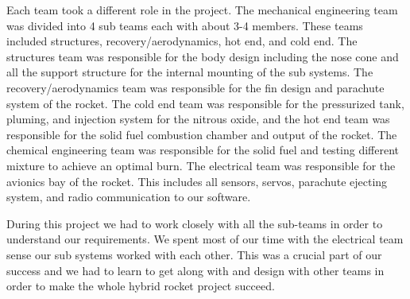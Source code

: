 \documentclass[10pt,draftclsnofoot,onecolumn,retainorgcmds]{IEEEtran}
\begin{document}
Each team took a different role in the project. The mechanical engineering team was divided into 4 sub teams each with about 3-4 members. These teams included structures, recovery/aerodynamics, hot end, and cold end. The structures team was responsible for the body design including the nose cone and all the support structure for the internal mounting of the sub systems. The recovery/aerodynamics team was responsible for the fin design and parachute system of the rocket. The cold end team was responsible for the pressurized tank, pluming, and injection system for the nitrous oxide, and the hot end team was responsible for the solid fuel combustion chamber and output of the rocket. The chemical engineering team was responsible for the solid fuel and testing different mixture to achieve an optimal burn. The electrical team was responsible for the avionics bay of the rocket. This includes all sensors, servos, parachute ejecting system, and radio communication to our software. \par
During this project we had to work closely with all the sub-teams in order to understand our requirements. We spent most of our time with the electrical team sense our sub systems worked with each other. This was a crucial part of our success and we had to learn to get along with and design with other teams in order to make the whole hybrid rocket project succeed. \par
\end{document}
